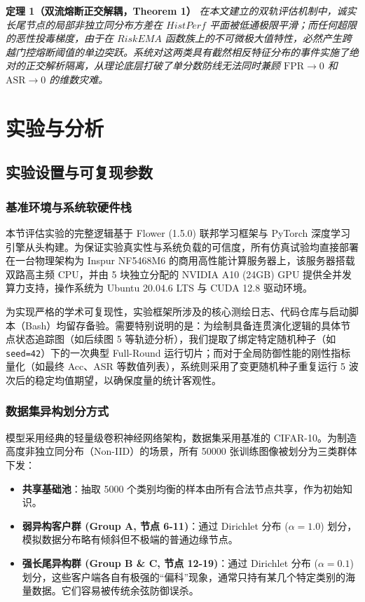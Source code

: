 \documentclass[runningheads]{llncs}
\begin{document}
\textbf{定理 1（双流熔断正交解耦，Theorem 1）}
\textit{在本文建立的双轨评估机制中，诚实长尾节点的局部非独立同分布方差在 $HistPerf$ 平面被低通极限平滑；而任何超限的恶性投毒梯度，由于在 $RiskEMA$ 函数族上的不可微极大值特性，必然产生跨越门控熔断阈值的单边突跃。系统对这两类具有截然相反特征分布的事件实施了绝对的正交解析隔离，从理论底层打破了单分数防线无法同时兼顾 $\text{FPR} \to 0$ 和 $\text{ASR} \to 0$ 的维数灾难。}

\section{实验与分析}
\label{sec:experiments}
\subsection{实验设置与可复现参数}

\subsubsection{基准环境与系统软硬件栈}
本节评估实验的完整逻辑基于 Flower (1.5.0) 联邦学习框架与 PyTorch 深度学习引擎从头构建。为保证实验真实性与系统负载的可信度，所有仿真试验均直接部署在一台物理架构为 Inspur NF5468M6 的商用高性能计算服务器上，该服务器搭载双路高主频 CPU，并由 5 块独立分配的 NVIDIA A10 (24GB) GPU 提供全并发算力支持，操作系统为 Ubuntu 20.04.6 LTS 与 CUDA 12.8 驱动环境。

为实现严格的学术可复现性，实验框架所涉及的核心测绘日志、代码仓库与启动脚本（Bash）均留存备验。需要特别说明的是：为绘制具备连贯演化逻辑的具体节点状态追踪图（如后续图 5 等轨迹分析），我们提取了绑定特定随机种子（如 \texttt{seed=42}）下的一次典型 Full-Round 运行切片；而对于全局防御性能的刚性指标量化（如最终 Acc、ASR 等数值列表），系统则采用了变更随机种子重复运行 5 波次后的稳定均值期望，以确保度量的统计客观性。

\subsubsection{数据集异构划分方式}
模型采用经典的轻量级卷积神经网络架构，数据集采用基准的 CIFAR-10。为制造高度非独立同分布（Non-IID）的场景，所有 50000 张训练图像被划分为三类群体下发：
\begin{itemize}
    \item \textbf{共享基础池}：抽取 5000 个类别均衡的样本由所有合法节点共享，作为初始知识。
    \item \textbf{弱异构客户群 (Group A, 节点 6-11)}：通过 Dirichlet 分布 ($\alpha=1.0$) 划分，模拟数据分布略有倾斜但不极端的普通边缘节点。
    \item \textbf{强长尾异构群 (Group B \& C, 节点 12-19)}：通过 Dirichlet 分布 ($\alpha=0.1$) 划分，这些客户端各自有极强的“偏科”现象，通常只持有某几个特定类别的海量数据。它们容易被传统余弦防御误杀。
\end{itemize}
\end{document}
